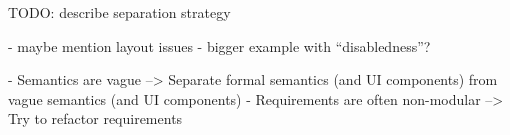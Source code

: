 \documentclass[sigplan,screen]{acmart}
\begin{document}
TODO: describe separation strategy

- maybe mention layout issues
- bigger example with ``disabledness''?

- Semantics are vague
--> Separate formal semantics (and UI components) from vague semantics (and UI components)
- Requirements are often non-modular
--> Try to refactor requirements



\end{document}
